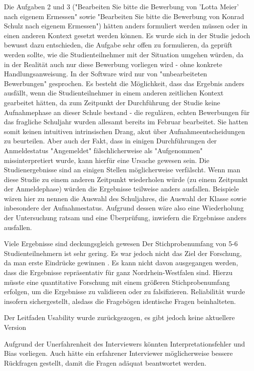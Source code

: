 Die Aufgaben 2 und 3 ("Bearbeiten Sie bitte die Bewerbung von 'Lotta Meier' nach eigenem Ermessen" sowie
"Bearbeiten Sie bitte die Bewerbung von Konrad Schulz nach eigenem Ermessen") hätten anders formuliert werden müssen oder in einen anderen Kontext gesetzt werden können. Es wurde sich in der Studie jedoch bewusst dazu entschieden, die Aufgabe sehr offen zu formulieren, da geprüft werden sollte, wie die Studienteilnehmer mit der Situation umgehen würden, da in der Realität auch nur diese Bewerbung vorliegen wird - ohne konkrete Handlungsanweisung. In der Software wird nur von "unbearbeiteten Bewerbungen" gesprochen. Es besteht die Möglichkeit, dass das Ergebnis anders ausfällt, wenn die Studienteilnehmer in einem anderen zeitlichen Kontext gearbeitet hätten, da zum Zeitpunkt der Durchführung der Studie keine Aufnahmephase an dieser Schule bestand - die regulären, echten Bewerbungen für das fragliche Schuljahr wurden allesamt bereits im Februar bearbeitet. Sie hatten somit keinen intuitiven intrinsischen Drang, akut über Aufnahmeentscheidungen zu beurteilen. Aber auch der Fakt, dass in einigen Durchführungen der Anmeldestatus "Angemeldet" fälschlicherweise als "Aufgenommen" missinterpretiert wurde, kann hierfür eine Ursache gewesen sein.
Die Studienergebnisse sind an einigen Stellen möglicherweise verfälscht. Wenn man diese Studie zu einem anderen Zeitpunkt wiederholen würde (zu einem Zeitpunkt der Anmeldephase) würden die Ergebnisse teilweise anders ausfallen. Beispiele wären hier zu nennen die Auswahl des Schuljahres, die Auswahl der Klasse sowie inbesondere der Aufnahmestatus. Aufgrund dessen wäre also eine Wiederholung der Untersuchung ratsam und eine Überprüfung, inwiefern die Ergebnisse anders ausfallen.

Viele Ergebnisse sind deckungsgleich gewesen
Der Stichprobenumfang von 5-6 Studienteilnehmern ist sehr gering. Es war jedoch nicht das Ziel der Forschung, da man erste Eindrücke gewinnen . Es kann nicht davon ausgegangen werden, dass die Ergebnisse repräsentativ für ganz Nordrhein-Westfalen sind. Hierzu müsste eine quantitative Forschung mit einem größeren Stichprobenumfang erfolgen, um die Ergebnisse zu validieren oder zu falsifizieren.
Reliabilität wurde insofern sichergestellt, alsdass die Fragebögen identische Fragen beinhalteten. 

Der Leitfaden Usability wurde zurückgezogen, es gibt jedoch keine aktuellere Version

Aufgrund der Unerfahrenheit des Interviewers könnten Interpretationsfehler und Bias vorliegen. Auch hätte ein erfahrener Interviewer möglicherweise bessere Rückfragen gestellt, damit die Fragen adäquat beantwortet werden.

